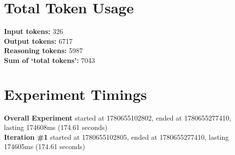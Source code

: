 \documentclass{article}
\begin{document}
\section*{Total Token Usage}
\textbf{Input tokens: }326
\\\textbf{Output tokens: }6717
\\\textbf{Reasoning tokens: }5987
\\\textbf{Sum of `total tokens': }7043
\section*{Experiment Timings}
\textbf{Overall Experiment} started at 1780655102802, ended at 1780655277410, lasting 174608ms (174.61 seconds)
\\\textbf{Iteration \#1} started at 1780655102805, ended at 1780655277410, lasting 174605ms (174.61 seconds)
\end{document}
